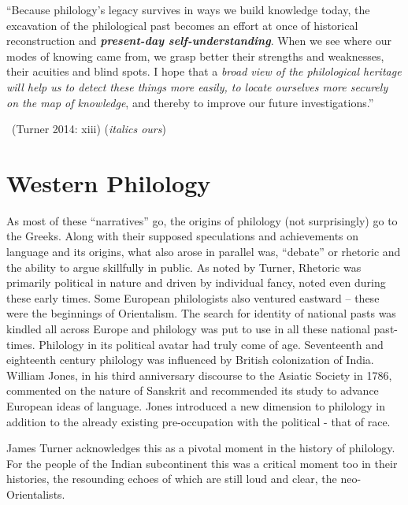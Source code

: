 \vskip 3pt

\begin{myquote}
“Because philology’s legacy survives in ways we build knowledge today, the excavation of the philological past becomes an effort at once of historical reconstruction and \textbf{\textit{present-day self-understanding}}. When we see where our modes of knowing came from, we grasp better their strengths and weaknesses, their acuities and blind spots. I hope that a \textit{broad view of the philological heritage will help us to detect these things more easily, to locate ourselves more securely on the map of knowledge}, and thereby to improve our future investigations.”

~\hfill (Turner 2014: xiii) (\textit{italics ours})
\end{myquote}


\section*{Western Philology}

\vskip 3pt

As most of these “narratives” go, the origins of philology (not surprisingly) go to the Greeks. Along with their supposed speculations and achievements on language and its origins, what also arose in parallel was, “debate” or rhetoric and the ability to argue skillfully in public. As noted by Turner, Rhetoric was primarily political in nature and driven by individual fancy, noted even during these early times. Some European philologists also ventured eastward – these were the beginnings of Orientalism. The search for identity of national pasts was kindled all across Europe and philology was put to use in all these national past-times. Philology in its political avatar had truly come of age. Seventeenth and eighteenth century philology was influenced by British colonization of India. William Jones, in his third anniversary discourse to the Asiatic Society in 1786, commented on the nature of Sanskrit and recommended its study to advance European ideas of language. Jones introduced a new dimension to philology in addition to the already existing pre-occupation with the political - that of race.

James Turner acknowledges this as a pivotal moment in the history of philology. For the people of the Indian subcontinent this was a critical moment too in their histories, the resounding echoes of which are still loud and clear, the neo-Orientalists.

